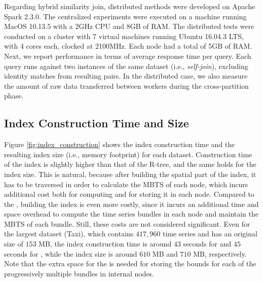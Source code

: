 Regarding hybrid similarity join, distributed methods were developed on Apache Spark 2.3.0. The centralized experiments were executed on a machine running MacOS 10.13.5 with a 2GHz CPU and 8GB of RAM. The distributed tests were conducted on a cluster with 7 virtual machines running Ubuntu 16.04.3 LTS, with 4 cores each, clocked at 2100MHz. Each node had a total of 5GB of RAM. Next, we report performance in terms of average response time per query. Each query runs against two instances of the same dataset (i.e., {\em self-join}), excluding identity matches from resulting pairs. In the distributed case, we also measure the amount of raw data transferred between workers during the cross-partition phase.

\subsection{Index Construction Time and Size}

Figure \ref{fig:index_construction} shows the index construction time and the resulting index size (i.e., memory footprint) for each dataset. Construction time of the \tsr index is slightly higher than that of the R-tree, and the same holds for the index size. This is natural, because after building the spatial part of the index, it has to be traversed in order to calculate the MBTS of each node, which incurs additional cost both for computing and for storing it in each node. Compared to the \tsr, building the \btsr index is even more costly, since it incurs an additional time and space overhead to compute the time series bundles in each node and maintain the MBTS of each bundle. Still, these costs are not considered significant. Even for the largest dataset (Taxi), which contains $417,960$ time series and has an original size of $153$ MB, the index construction time is around $43$ seconds for \tsr and $45$ seconds for \btsr, while the index size is around $610$ MB and $710$ MB, respectively. Note that the extra space for the \btsr is needed for storing the bounds for each of the progressively multiple bundles in internal nodes.

